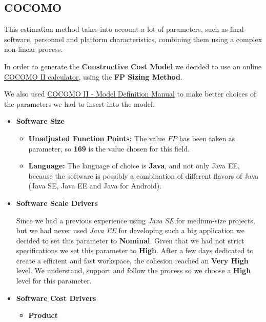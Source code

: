 \subsection{COCOMO}
This estimation method takes into account a lot of parameters, such as final software, personnel and platform characteristics, combining them using a complex non-linear process.\par
In order to generate the \textbf{Constructive Cost Model} we decided to use an online \href{http://csse.usc.edu/tools/COCOMOII.php}{COCOMO II calculator}, using the \textbf{FP Sizing Method}.\par
We also used \href{http://csse.usc.edu/csse/research/COCOMOII/cocomo2000.0/CII_modelman2000.0.pdf}{COCOMO II - Model Definition Manual} to make better choices of the parameters we had to insert into the model.
\begin{itemize}
	\item \textbf{Software Size}
	\begin{itemize}
		\item \textbf{Unadjusted Function Points:} The value $FP$ has been taken as parameter, so \textbf{169} is the value chosen for this field.
		\item \textbf{Language:} The language of choice is \textbf{Java}, and not only Java EE, because the software is possibly a combination of different flavors of Java (Java SE, Java EE and Java for Android).
	\end{itemize}
	\item \textbf{Software Scale Drivers}
	\begin{itemize}
		 Since we had a previous experience using \textit{Java SE} for medium-size projects, but we had never used \textit{Java EE} for developing such a big application we decided to set this parameter to \textbf{Nominal}.
		 Given that we had not strict specifications we set this parameter to \textbf{High}.
		 After a few days dedicated to create a efficient and fast workspace, the cohesion reached an \textbf{Very High} level.
		 We understand, support and follow the process so we choose a \textbf{High} level for this parameter.
	\end{itemize}
	\item \textbf{Software Cost Drivers}
	\begin{itemize}
		\item \textbf{Product}

\end{itemize}
\end{itemize}

